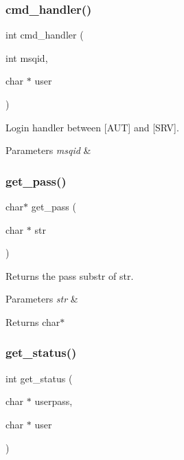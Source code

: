 \subsubsection{cmd\+\_\+handler()}
{\footnotesize\ttfamily int cmd\+\_\+handler (\begin{DoxyParamCaption}\item[{int}]{msqid,  }\item[{char $\ast$}]{user }\end{DoxyParamCaption})}



Login handler between [A\+UT] and [S\+RV]. 


\begin{DoxyParams}{Parameters}
{\em msqid} & \\
\hline
\end{DoxyParams}
\mbox{\label{auth_8h_ab699bd210dfe5219d858aeb212650f47}} 
\subsubsection{get\+\_\+pass()}
{\footnotesize\ttfamily char$\ast$ get\+\_\+pass (\begin{DoxyParamCaption}\item[{char $\ast$}]{str }\end{DoxyParamCaption})}



Returns the pass substr of str. 


\begin{DoxyParams}{Parameters}
{\em str} & \\
\hline
\end{DoxyParams}
\begin{DoxyReturn}{Returns}
char$\ast$ 
\end{DoxyReturn}
\mbox{\label{auth_8h_ac2d257768c5b44d17c6fe989707468a5}} 
\subsubsection{get\+\_\+status()}
{\footnotesize\ttfamily int get\+\_\+status (\begin{DoxyParamCaption}\item[{char $\ast$}]{userpass,  }\item[{char $\ast$}]{user }\end{DoxyParamCaption})}



